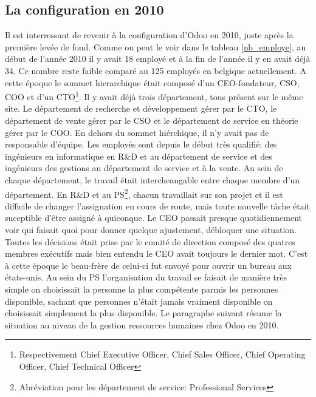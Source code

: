 \subsection{La configuration en 2010}
Il est interressant de revenir à la configuration d'Odoo en 2010, juste après la première levée de fond. Comme on peut le voir dans le tableau \ref{nb_employe}, au début de l'année 2010 il y avait 18 employé et à la fin de l'année il y en avait déjà 34. Ce nombre reste faible comparé au 125 employés en belgique actuellement. A cette époque le sommet hierarchique était composé d'un CEO-fondateur, CSO, COO et d'un CTO\footnote{Respectivement Chief Executive Officer, Chief Sales Officer, Chief Operating Officer, Chief Technical Officer}. Il y avait déjà trois département, tous présent sur le même site. Le département de recherche et développement gérer par le CTO, le département de vente gérer par le CSO et le département de service en théorie gérer par le COO. En dehors du sommet hiérchique, il n'y avait pas de responsable d'équipe. Les employés sont depuis le début très qualifié: des ingénieurs en informatique en R\&D et au département de service et des ingénieurs des gestions au département de service et à la vente. Au sein de chaque département, le travail était intercheangable entre chaque membre d'un département. En R\&D et au PS\footnote{Abréviation pour les département de service: Professional Services}, chacun travaillait sur son projet et il est difficile de changer l'assignation en cours de route, mais toute nouvelle tâche était suceptible d'être assigné à quiconque. Le CEO passait presque quotidiennement voir qui faisait quoi pour donner quelque ajustement, débloquer une situation. Toutes les décisions était prise par le comité de direction composé des quatres membres exécutifs mais bien entendu le CEO avait toujours le dernier mot. C'est à cette époque le beau-frère de celui-ci fut envoyé pour ouvrir un bureau aux états-unis. Au sein du PS l'organisation du travail se faisait de manière très simple on choisissait la personne la plus compétente parmis les personnes disponible, sachant que personnes n'était jamais vraiment disponible on choisissait simplement la plus disponible. Le paragraphe suivant résume la situation au niveau de la gestion ressources humaines chez Odoo en 2010.

